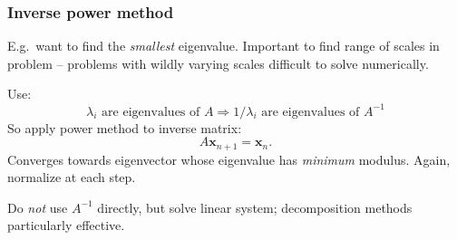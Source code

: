 \documentclass{beamer}
\newcommand{\bfm}[1]{{\boldsymbol{#1}}}
\newcommand{\bx}{\bfm{x}}
\begin{document}
\begin{frame}
  \frametitle{Inverse power method}

  E.g.\ want to find the \emph{smallest} eigenvalue. Important to find
  range of scales in problem -- problems with wildly varying scales
  difficult to solve numerically. \pause

  \vspace{1ex}

  Use:
  \begin{equation*}
    \lambda_i \text{ are eigenvalues of } A \Rightarrow
    1/\lambda_i \text{ are eigenvalues of } A^{-1}
  \end{equation*} \pause
  So apply power method to inverse matrix:
  \begin{equation*}
    A \bx_{n+1} = \bx_n.
  \end{equation*}
  Converges towards eigenvector whose eigenvalue has \emph{minimum}
  modulus. Again, normalize at each step. \pause

  \vspace{1ex}

  Do \emph{not} use $A^{-1}$ directly, but solve linear system;
  decomposition methods particularly effective.

\end{frame}
\end{document}
